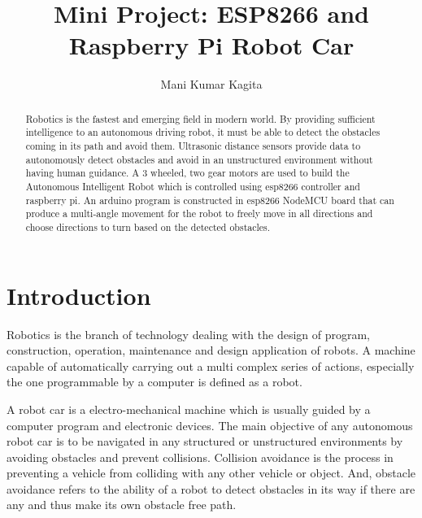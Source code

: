 \documentclass[sigconf]{acmart}
\begin{document}
\title{Mini Project: ESP8266 and Raspberry Pi Robot Car}

\author{Mani Kumar Kagita}


\begin{abstract}
Robotics is the fastest and emerging field in modern world. By providing sufficient intelligence to an autonomous driving robot, it must be able to detect the obstacles coming in its path and avoid them. Ultrasonic distance sensors provide data to autonomously detect obstacles and avoid in an unstructured environment without having human guidance. A 3 wheeled, two gear motors are used to build the Autonomous Intelligent Robot which is controlled using esp8266 controller and raspberry pi. An arduino program is constructed in esp8266 NodeMCU board that can produce a multi-angle movement for the robot to freely move in all directions and choose directions to turn based on the detected obstacles. 

\end{abstract}


\maketitle

\section{Introduction}
Robotics is the branch of technology dealing with the design of program, construction, operation, maintenance and design application of robots. A machine capable of automatically carrying out a multi complex series of actions, especially the one programmable by a computer is defined as a robot. 

A robot car is a electro-mechanical machine which is usually guided by a computer program and electronic devices. The main objective of any autonomous robot car is to be navigated in any structured or unstructured environments by avoiding obstacles and prevent collisions. 
Collision avoidance is the process in preventing a vehicle from colliding with any other vehicle or object. And, obstacle avoidance refers to the ability of a robot to detect obstacles in its way if there are any and thus make its own obstacle free path.
\end{document}
